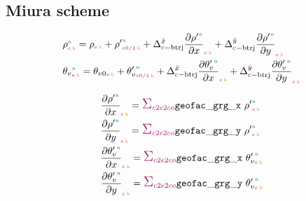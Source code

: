 \clearpage
\subsection{Miura scheme}
\label{sub:miura}

\begin{align}
  &\density{\n}{\e}{\k} = \densityref{\e}{\k} + \densityprime{\n}{\c 0/1}{\k} + \Delta^{\hat{x}}_{\c - \text{btrj}} \densityprimedx{\n}{\c}{\k} + \Delta^{\hat{y}}_{\c - \text{btrj}} \densityprimedy{\n}{\c}{\k} \\
  &\vpotemp{\n}{\e}{\k} = \vpotempref{\e}{\k} + \vpotempprime{\n}{\c 0/1}{\k} + \Delta^{\hat{x}}_{\c - \text{btrj}} \vpotempprimedx{\n}{\c}{\k} + \Delta^{\hat{y}}_{\c - \text{btrj}} \vpotempprimedy{\n}{\c}{\k}
\end{align}

\begin{align}
  & \densityprimedx{\n}{\c}{\k} = \sum_{\offProv{c2e2co}} \geofacgrgx\ \densityprime{\n}{\c}{\k} \\
  & \densityprimedy{\n}{\c}{\k} = \sum_{\offProv{c2e2co}} \geofacgrgy\ \densityprime{\n}{\c}{\k} \\
  & \vpotempprimedx{\n}{\c}{\k} = \sum_{\offProv{c2e2co}} \geofacgrgx\ \vpotempprime{\n}{\c}{\k} \\
  & \vpotempprimedy{\n}{\c}{\k} = \sum_{\offProv{c2e2co}} \geofacgrgy\ \vpotempprime{\n}{\c}{\k}
\end{align}
